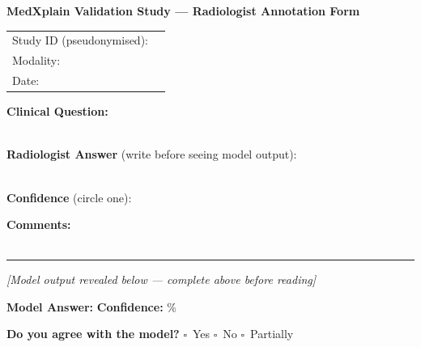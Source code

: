 \begin{mdframed}
\textbf{MedXplain Validation Study --- Radiologist Annotation Form}

\vspace{4mm}
\begin{tabular}{@{}ll}
Study ID (pseudonymised): & \underline{\hspace{6cm}} \\[2mm]
Modality:                 & \underline{\hspace{6cm}} \\[2mm]
Date:                     & \underline{\hspace{6cm}} \\
\end{tabular}

\vspace{4mm}
\textbf{Clinical Question:}\\
\underline{\hspace{12cm}}\\[1mm]
\underline{\hspace{12cm}}

\vspace{3mm}
\textbf{Radiologist Answer} (write before seeing model output):\\
\underline{\hspace{12cm}}\\[1mm]
\underline{\hspace{12cm}}

\vspace{2mm}
\textbf{Confidence} (circle one):     

\vspace{2mm}
\textbf{Comments:}\\
\underline{\hspace{12cm}}\\[1mm]
\underline{\hspace{12cm}}

\vspace{5mm}
\rule{\textwidth}{0.4pt}

\vspace{3mm}
\textit{[Model output revealed below --- complete above before reading]}

\vspace{3mm}
\textbf{Model Answer:} \underline{\hspace{8cm}}
\quad \textbf{Confidence:} \underline{\hspace{2cm}}\%

\vspace{3mm}
\textbf{Do you agree with the model?}
\quad $\square$~Yes \quad $\square$~No \quad $\square$~Partially


\end{mdframed}
